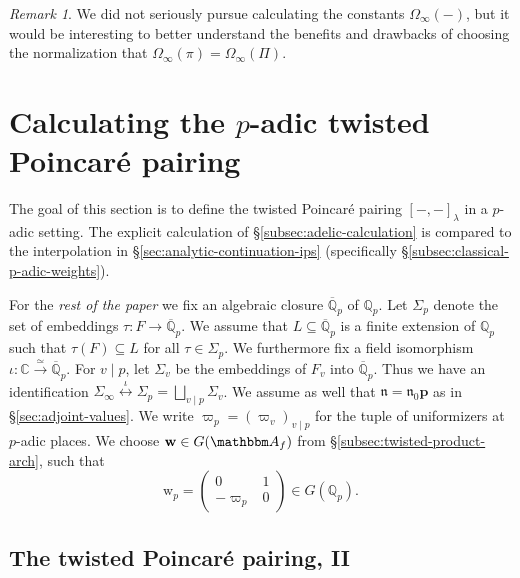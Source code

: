 \documentclass[10pt, twoside]{amsart}
\theoremstyle{plain}
\theoremstyle{definition}
\theoremstyle{remark}
\newtheorem{remark}[theorem]{Remark}
\numberwithin{equation}{subsection}
\def\Q{\mathbb Q}
\def\C{\mathbb C}
\def\A{\mathbbm A}
\def\p{\mathbf{p}}
\def\gn{\mathfrak n}
\def\qpbar{\overline{\mathbb Q}_p}
\begin{document}
\begin{remark}
We did not seriously pursue calculating the constants $\Omega_\infty(-)$, but it would be interesting to better understand the benefits and drawbacks of choosing the normalization that $\Omega_\infty(\pi) = \Omega_\infty(\Pi)$.
\end{remark}


\section{Calculating the $p$-adic twisted Poincar\'e pairing}\label{sec:padic-pairing-calculation}

The goal of this section is to define the twisted Poincar\'e pairing $[-,-]_{\lambda}$ in a $p$-adic setting. The explicit calculation of \S \ref{subsec:adelic-calculation} is compared to the interpolation in \S  \ref{sec:analytic-continuation-ips} (specifically \S \ref{subsec:classical-p-adic-weights}).

For the {\em rest of the paper} we fix an algebraic closure $\qpbar$ of $\Q_p$. Let $\Sigma_p$ denote the set of embeddings $\tau: F \rightarrow \qpbar$. We assume that $L\subseteq \qpbar$ is a finite extension of $\Q_p$ such that $\tau(F) \subseteq L$ for all $\tau \in \Sigma_p$. We furthermore fix a field isomorphism $\iota : \C \xrightarrow{\simeq} \qpbar$. For $v \mid p$, let $\Sigma_v$ be the embeddings of $F_v$ into $\qpbar$. Thus we have an identification $\Sigma_\infty \overset{\iota}{\leftrightarrow} \Sigma_p = \bigsqcup_{v \mid p} \Sigma_v$. We assume as well that $\gn = \gn_0 \p$ as in \S \ref{sec:adjoint-values}. We write $\varpi_p = (\varpi_v)_{v \mid p}$ for the tuple of uniformizers at $p$-adic places. We choose ${ \boldsymbol{\mathrm{w}}} \in G(\A_f)$ from \S \ref{subsec:twisted-product-arch}, such that
\begin{equation}\label{eqn:taup-nup-calculation}
{ \boldsymbol{\mathrm{w}}}_p = \begin{pmatrix} 0 & 1 \\ -\varpi_p & 0 \end{pmatrix} \in G(\Q_p).
\end{equation}

\subsection{The twisted Poincar\'e pairing, II}\label{subsec:p-adictwisted}
\end{document}
